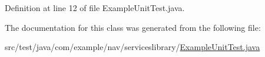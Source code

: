Definition at line 12 of file Example\+Unit\+Test.\+java.



The documentation for this class was generated from the following file\+:\begin{DoxyCompactItemize}
\item 
src/test/java/com/example/nav/serviceslibrary/\hyperlink{_example_unit_test_8java}{Example\+Unit\+Test.\+java}\end{DoxyCompactItemize}
